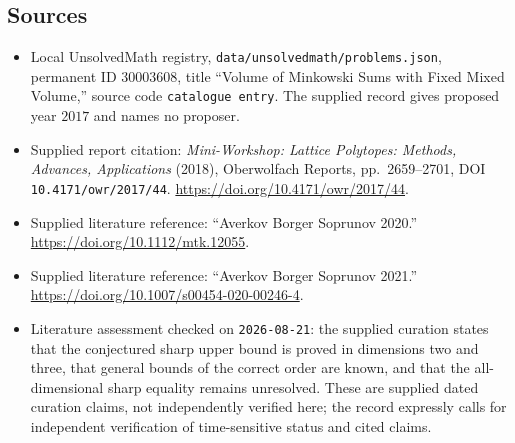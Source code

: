 \documentclass[11pt]{article}
\begin{document}
\subsection{Sources}
\begin{itemize}
\item Local UnsolvedMath registry, \texttt{data/unsolvedmath/problems.json}, permanent ID \(30003608\), title ``Volume of Minkowski Sums with Fixed Mixed Volume,'' source code \texttt{catalogue entry}. The supplied record gives proposed year \(2017\) and names no proposer.
\item Supplied report citation: \emph{Mini-Workshop: Lattice Polytopes: Methods, Advances, Applications} (2018), Oberwolfach Reports, pp.\ 2659--2701, DOI \texttt{10.4171/owr/2017/44}. \url{https://doi.org/10.4171/owr/2017/44}.
\item Supplied literature reference: ``Averkov Borger Soprunov 2020.'' \url{https://doi.org/10.1112/mtk.12055}.
\item Supplied literature reference: ``Averkov Borger Soprunov 2021.'' \url{https://doi.org/10.1007/s00454-020-00246-4}.
\item Literature assessment checked on \texttt{2026-08-21}: the supplied curation states that the conjectured sharp upper bound is proved in dimensions two and three, that general bounds of the correct order are known, and that the all-dimensional sharp equality remains unresolved. These are supplied dated curation claims, not independently verified here; the record expressly calls for independent verification of time-sensitive status and cited claims.
\end{itemize}
\end{document}
